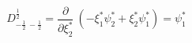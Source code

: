 \begin{equation}
D_{-\frac{1}{2}~-\frac{1}{2}}^{\frac{1}{2}}= \frac{\partial}{\partial \xi_2^*}~(-\xi_1^* \psi_2^* +\xi_2^* \psi_1^*)= \psi_1^*~~~~~~~~~~~~~~~~~~~~~~
\end{equation}

